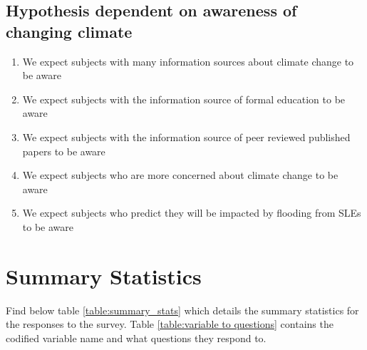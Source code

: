 \paragraph{}

\subsection{Hypothesis dependent on awareness of changing climate}
\begin{enumerate}
    \item We expect subjects with many information sources about climate change to be aware
    \item We expect subjects with the information source of formal education to be aware
    \item We expect subjects with the information source of peer reviewed published papers to be aware
    \item We expect subjects who are more concerned about climate change to be aware
    \item We expect subjects who predict they will be impacted by flooding from SLEs to be aware
\end{enumerate}

\section{Summary Statistics }
Find below table \ref{table:summary_stats} which details the summary statistics for the responses to the survey. Table \ref{table:variable to questions} contains the codified variable name and what questions they respond to.



